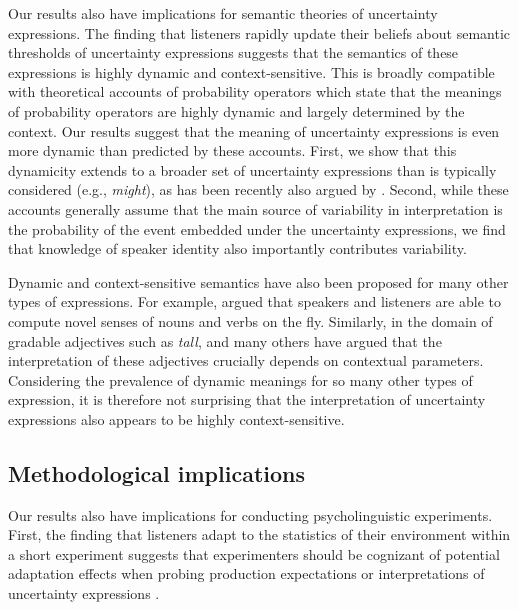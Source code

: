 Our results also have implications for semantic theories of uncertainty expressions.
The finding that listeners rapidly update their beliefs about semantic thresholds of uncertainty expressions
suggests that the semantics of these expressions is highly dynamic and context-sensitive. This is broadly compatible with 
theoretical accounts of probability operators \cite[a subset of uncertainty expressions; e.g.,][]{Yalcin2010} which 
state that the meanings of probability operators are highly dynamic and largely determined by the context. Our results
suggest that the meaning of uncertainty expressions is even more dynamic than predicted by these accounts. First, we show that this dynamicity 
extends to a broader set of uncertainty expressions than is typically considered (e.g., \textit{might}), as has been recently also argued by \cite{Lassiter2016}. 
Second, while these accounts generally assume 
that the main source of variability in interpretation is the probability of the event
embedded under the uncertainty expressions, we find that knowledge of speaker identity also  importantly contributes variability.

Dynamic and context-sensitive semantics have also been proposed for many other types of expressions.
For example, \cite{Clark1983} argued that speakers and listeners
are able to compute novel senses of nouns and verbs on the fly. Similarly, in the domain of gradable adjectives such as \textit{tall},
\cite{Kennedy2007} and many others have argued that the interpretation of these adjectives crucially depends on contextual
parameters. Considering the prevalence of dynamic meanings for so many other types of expression, it is therefore not 
surprising that the interpretation of uncertainty expressions also appears to be highly context-sensitive.
 
\subsection{Methodological implications}

Our results also have implications for conducting psycholinguistic experiments. First,
the finding that listeners adapt to the statistics of their environment within a short experiment
suggests that experimenters should be cognizant of potential adaptation effects when probing
production expectations or interpretations of uncertainty expressions \cite[see also][]{Jaeger2010}. 

